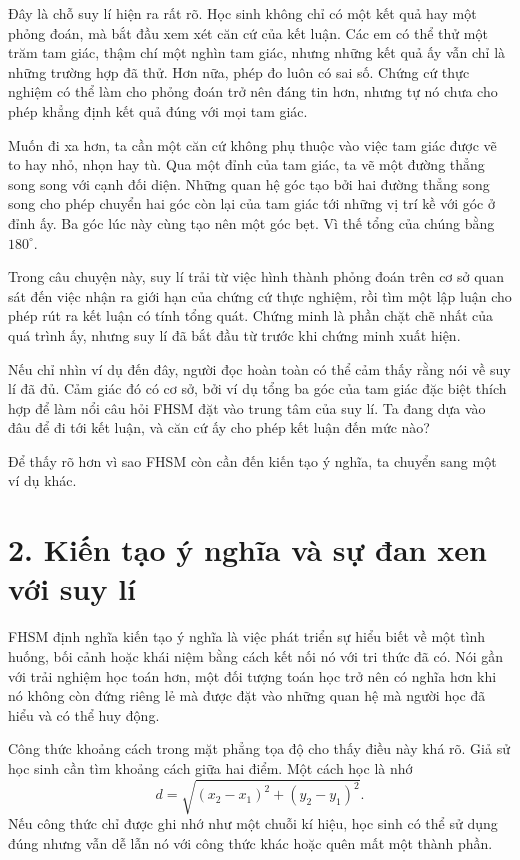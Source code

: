 Đây là chỗ suy lí hiện ra rất rõ. Học sinh không chỉ có một kết quả hay một phỏng đoán, mà bắt đầu xem xét căn cứ của kết luận. Các em có thể thử một trăm tam giác, thậm chí một nghìn tam giác, nhưng những kết quả ấy vẫn chỉ là những trường hợp đã thử. Hơn nữa, phép đo luôn có sai số. Chứng cứ thực nghiệm có thể làm cho phỏng đoán trở nên đáng tin hơn, nhưng tự nó chưa cho phép khẳng định kết quả đúng với mọi tam giác.

Muốn đi xa hơn, ta cần một căn cứ không phụ thuộc vào việc tam giác được vẽ to hay nhỏ, nhọn hay tù. Qua một đỉnh của tam giác, ta vẽ một đường thẳng song song với cạnh đối diện. Những quan hệ góc tạo bởi hai đường thẳng song song cho phép chuyển hai góc còn lại của tam giác tới những vị trí kề với góc ở đỉnh ấy. Ba góc lúc này cùng tạo nên một góc bẹt. Vì thế tổng của chúng bằng $180^\circ$.

Trong câu chuyện này, suy lí trải từ việc hình thành phỏng đoán trên cơ sở quan sát đến việc nhận ra giới hạn của chứng cứ thực nghiệm, rồi tìm một lập luận cho phép rút ra kết luận có tính tổng quát. Chứng minh là phần chặt chẽ nhất của quá trình ấy, nhưng suy lí đã bắt đầu từ trước khi chứng minh xuất hiện.

Nếu chỉ nhìn ví dụ đến đây, người đọc hoàn toàn có thể cảm thấy rằng nói về suy lí đã đủ. Cảm giác đó có cơ sở, bởi ví dụ tổng ba góc của tam giác đặc biệt thích hợp để làm nổi câu hỏi FHSM đặt vào trung tâm của suy lí. Ta đang dựa vào đâu để đi tới kết luận, và căn cứ ấy cho phép kết luận đến mức nào?

Để thấy rõ hơn vì sao FHSM còn cần đến kiến tạo ý nghĩa, ta chuyển sang một ví dụ khác.

\section*{2. Kiến tạo ý nghĩa và sự đan xen với suy lí}

FHSM định nghĩa kiến tạo ý nghĩa là việc phát triển sự hiểu biết về một tình huống, bối cảnh hoặc khái niệm bằng cách kết nối nó với tri thức đã có. Nói gần với trải nghiệm học toán hơn, một đối tượng toán học trở nên có nghĩa hơn khi nó không còn đứng riêng lẻ mà được đặt vào những quan hệ mà người học đã hiểu và có thể huy động.

Công thức khoảng cách trong mặt phẳng tọa độ cho thấy điều này khá rõ. Giả sử học sinh cần tìm khoảng cách giữa hai điểm. Một cách học là nhớ
$$
d=\sqrt{(x_2-x_1)^2+(y_2-y_1)^2}.
$$
Nếu công thức chỉ được ghi nhớ như một chuỗi kí hiệu, học sinh có thể sử dụng đúng nhưng vẫn dễ lẫn nó với công thức khác hoặc quên mất một thành phần.

